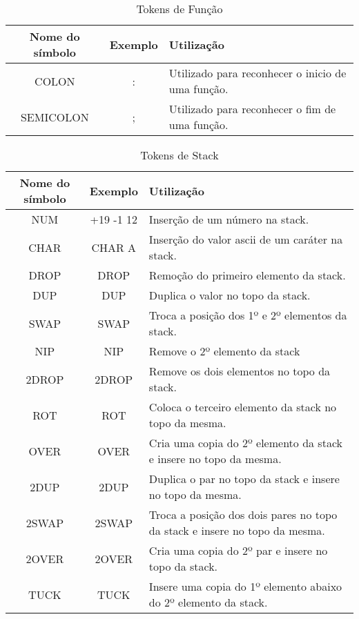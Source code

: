 \documentclass{article}
\begin{document}
\begin{table}[h]
    \centering
    \begin{tabular}{|c|c|p{6cm}|}
         \hline
         \textbf{Nome do símbolo}& \textbf{Exemplo} &\textbf{Utilização}\\
         \hline
         COLON& :& Utilizado para reconhecer o inicio de uma função.\\  \hline 
         SEMICOLON& ;&Utilizado para reconhecer o fim de uma função.\\ 
         \hline
    \end{tabular}
    \caption{Tokens de Função}
    \label{tab:arit}
\end{table}

\begin{table}[h]
    \centering
    \begin{tabular}{|c|c|p{6cm}|}
         \hline
         \textbf{Nome do símbolo}& \textbf{Exemplo} &\textbf{Utilização}\\
         \hline
         NUM& +19 -1 12& Inserção de um número na stack.\\ \hline 
         CHAR& CHAR A& Inserção do valor ascii de um caráter na stack.\\ \hline 
         DROP& DROP& Remoção do primeiro elemento da stack.\\ \hline
         DUP& DUP& Duplica o valor no topo da stack.\\ \hline
         SWAP& SWAP& Troca a posição dos 1º e 2º elementos da stack.\\ \hline 
         NIP& NIP& Remove o 2º elemento da stack\\ \hline
         2DROP& 2DROP& Remove os dois elementos no topo da stack.\\ \hline
         ROT& ROT& Coloca o terceiro elemento da stack no topo da mesma.\\ \hline
         OVER& OVER& Cria uma copia do 2º elemento da stack e insere no topo da mesma.\\ \hline
         2DUP& 2DUP& Duplica o par no topo da stack e insere no topo da mesma. \\ \hline 
         2SWAP& 2SWAP& Troca a posição dos dois pares no topo da stack e insere no topo da mesma.\\ \hline 
         2OVER& 2OVER& Cria uma copia do 2º par e insere no topo da stack. \\ \hline 
         TUCK& TUCK& Insere uma copia do 1º elemento abaixo do 2º elemento da stack. \\ 
         \hline 
    \end{tabular}
    \caption{Tokens de Stack}
    \label{tab:arit}
\end{table}
\end{document}
